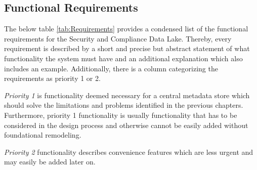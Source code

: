 \subsection{Functional Requirements}
The below table \ref{tab:Requirements} provides a condensed list of the functional requirements for the Security and Compliance Data Lake. Thereby, every requirement is described by a short and precise but abstract statement of what functionality the system must have and an additional explanation which also includes an example. Additionally, there is a column categorizing the requirements as priority 1 or 2.\par 
\emph{Priority 1} is functionality deemed necessary for a central metadata store which should solve the limitations and problems identified in the previous chapters. Furthermore, priority 1 functionality is usually functionality that has to be considered in the design process and otherwise cannot be easily added without foundational remodeling.\par
\emph{Priority 2} functionality describes convenience features which are less urgent and may easily be added later on.
